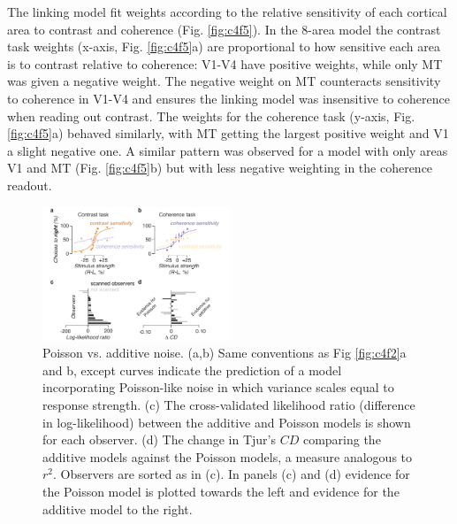 \documentclass{report}
\begin{document}
The linking model fit weights according to the relative sensitivity of each cortical area to contrast and coherence (Fig. \ref{fig:c4f5}). In the 8-area model the contrast task weights (x-axis, Fig. \ref{fig:c4f5}a) are proportional to how sensitive each area is to contrast relative to coherence: V1-V4 have positive weights, while only MT was given a negative weight. The negative weight on MT counteracts sensitivity to coherence in V1-V4 and ensures the linking model was insensitive to coherence when reading out contrast. The weights for the coherence task (y-axis, Fig. \ref{fig:c4f5}a) behaved similarly, with MT getting the largest positive weight and V1 a slight negative one. A similar pattern was observed for a model with only areas V1 and MT (Fig. \ref{fig:c4f5}b) but with less negative weighting in the coherence readout.  

\begin{figure}
\centering
\includegraphics[keepaspectratio,width=0.5\textwidth]{figs_c2/Fig6_poisson.pdf}
\caption[Poisson vs. additive noise]{Poisson vs. additive noise. (a,b) Same conventions as Fig \ref{fig:c4f2}a and b, except curves indicate the prediction of a model incorporating Poisson-like noise in which variance scales equal to response strength. (c) The cross-validated likelihood ratio (difference in log-likelihood) between the additive and Poisson models is shown for each observer. (d) The change in Tjur’s $CD$ comparing the additive models against the Poisson models, a measure analogous to $r^2$. Observers are sorted as in (c). In panels (c) and (d) evidence for the Poisson model is plotted towards the left and evidence for the additive model to the right.}
\label{fig:c4f6}
\end{figure}
\end{document}
